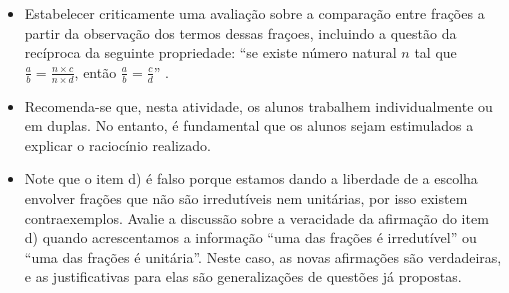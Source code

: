 \begin{multicols}{2}
\begin{objetivos}[label=chap4-ativ23]{}{}


\begin{itemize} %
  \item     Estabelecer criticamente uma avaliação sobre a comparação entre
frações a partir da observação dos termos dessas fraçoes, incluindo a questão da
recíproca da seguinte propriedade:     ``se existe número natural $n$ tal que
$\frac{a}{b} = \frac{n \times c}{n \times d}$, então $\frac{a}{b} =
\frac{c}{d}$''    .
\end{itemize} %
\end{objetivos}

\begin{orientacoes}{}{}
\begin{itemize} %
  \item     Recomenda-se que, nesta atividade, os alunos trabalhem
individualmente ou em duplas. No entanto, é fundamental que os alunos sejam
estimulados a explicar o raciocínio realizado.
  \item     Note que o item d) é falso porque estamos dando a liberdade de a
escolha envolver frações que não são irredutíveis nem unitárias, por isso
existem contraexemplos. Avalie a discussão sobre a veracidade da afirmação do
item d) quando acrescentamos a informação ``uma das frações é irredutível'' ou
``uma das frações é unitária''. Neste caso, as novas afirmações são verdadeiras,
e as justificativas para elas são generalizações de questões já propostas.
\end{itemize} %



\end{orientacoes}


\end{multicols}
